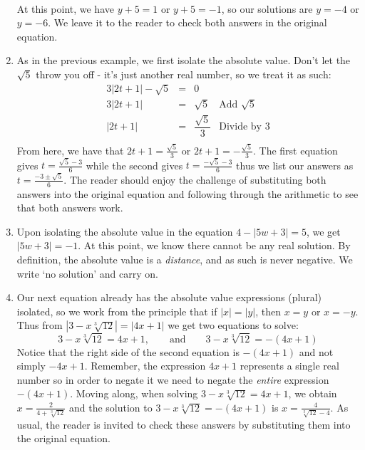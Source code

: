 \documentclass{ximera}
\begin{document}
\begin{ex}
\begin{enumerate}
\[\begin{array}{rclr}
\end{array} \] At this point, we have $y+5 = 1$ or $y+5 = -1$, so our solutions are $y = -4$ or $y = -6$.  We leave it to the reader to check both answers in the original equation.

\item As in the previous example, we first isolate the absolute value.  Don't let the $\sqrt{5}$ throw you off - it's just another real number, so we treat it as such:\[ \begin{array}{rclr}

 3|2t+1| - \sqrt{5} & = & 0 & \\
 3|2t+1|  & = &  \sqrt{5} & \text{Add $\sqrt{5}$} \\
 |2t + 1| & = & \dfrac{\sqrt{5}}{3} & \text{Divide by $3$}\\
\end{array} \] From here, we have that $2t+1 = \frac{\sqrt{5}}{3}$ or $2t+1 = -\frac{\sqrt{5}}{3}$. The first equation gives $t = \frac{\sqrt{5}-3}{6}$ while the second gives $t = \frac{-\sqrt{5}-3}{6}$ thus we list our answers as $t = \frac{-3 \pm \sqrt{5}}{6}$.   The reader should enjoy the challenge of substituting both answers into the original equation and following through the arithmetic to see that both answers work.

\item  Upon isolating the absolute value in the equation $4 - |5w+3| = 5$, we get $|5w+3| = -1$.  At this point, we know there cannot be any real solution.  By definition, the absolute value is a \textit{distance}, and as such is never negative.  We write `no solution' and carry on.

\item Our next equation already has the absolute value expressions (plural) isolated, so we work from the principle that if $|x| = |y|$, then $x = y$ or $x = -y$. Thus from $\left|3 - x \sqrt[3]{12}\right| = |4x+1|$ we get two equations to solve:  \[ 3 - x \sqrt[3]{12} = 4x+1, \qquad \text{and} \qquad 3 - x \sqrt[3]{12} = -(4x+1) \] Notice that the right side of the second equation is $-(4x+1)$ and not simply $-4x+1$.  Remember, the expression $4x+1$ represents a single real number so in order to negate it we need to negate the \textit{entire} expression $-(4x+1)$. Moving along, when solving $3 - x \sqrt[3]{12} = 4x+1$, we obtain $x = \frac{2}{4 + \sqrt[3]{12}}$ and the solution to $3 - x \sqrt[3]{12} = -(4x+1)$ is $x = \frac{4}{\sqrt[3]{12}-4}$.  As usual, the reader is invited to check these answers by substituting them into the original equation.


\end{enumerate}
\end{ex}
\end{document}
